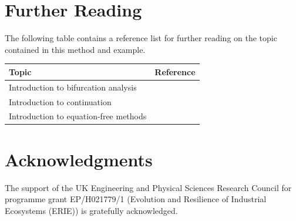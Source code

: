 \documentclass[11pt]{article}
\begin{document}
 
 
\section{Further Reading}

The following table contains a reference list for further reading on the topic contained in this method and example. 
\begin{center}
\begin{tabular}{|l|c|}
\hline
Topic									&	Reference \\ \hline
Introduction to bifurcation analysis		&	\cite{Meunier1988}	\\
Introduction to continuation 			&	\cite{Doedel1991,Allgower1990,Rheinboldt2000,Krauskopf2007} \\ 
Introduction to equation-free methods	&	\cite{Theodoropoulos2000,Kevrekidis2003,Kevrekidis2009}	\\
\hline
\end{tabular}
\end{center}



\section*{Acknowledgments}
{The support of the UK Engineering and Physical Sciences Research Council for programme grant EP/H021779/1 (Evolution and Resilience of Industrial Ecosystems (ERIE)) is gratefully acknowledged.}
 
\end{document}
